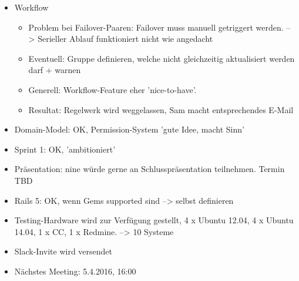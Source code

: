 \documentclass[class=scrbook,crop=false]{standalone}
\begin{document}
	\begin{itemize}
        \item Workflow
        \begin{itemize}
            \item Problem bei Failover-Paaren: Failover muss manuell getriggert werden. --> Serieller Ablauf funktioniert nicht wie angedacht
            \item Eventuell: Gruppe definieren, welche nicht gleichzeitig aktualisiert werden darf + warnen
            \item Generell: Workflow-Feature eher 'nice-to-have'.
            \item Resultat: Regelwerk wird weggelassen, Sam macht entsprechendes E-Mail
        \end{itemize}
        \item Domain-Model: OK, Permission-System 'gute Idee, macht Sinn'
        \item Sprint 1: OK, 'ambitioniert'
        \item Präsentation: \gls{nine} würde gerne an Schlusspräsentation teilnehmen. Termin TBD
        \item Rails 5: OK, wenn Gems supported sind --> selbst definieren
        \item Testing-Hardware wird zur Verfügung gestellt, 4 x Ubuntu 12.04, 4 x Ubuntu 14.04, 1 x CC, 1 x Redmine. --> 10 Systeme
        \item Slack-Invite wird versendet
        \item Nächstes Meeting: 5.4.2016, 16:00
    \end{itemize}
\end{document}
